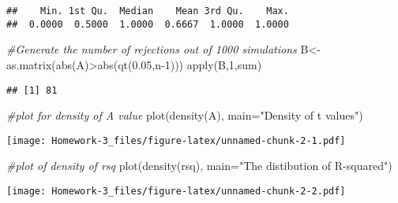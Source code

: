 \documentclass[
]{article}
\newenvironment{Shaded}{\begin{snugshade}}{\end{snugshade}}
\newcommand{\AttributeTok}[1]{\textcolor[rgb]{0.77,0.63,0.00}{#1}}
\newcommand{\CommentTok}[1]{\textcolor[rgb]{0.56,0.35,0.01}{\textit{#1}}}
\newcommand{\DecValTok}[1]{\textcolor[rgb]{0.00,0.00,0.81}{#1}}
\newcommand{\FloatTok}[1]{\textcolor[rgb]{0.00,0.00,0.81}{#1}}
\newcommand{\FunctionTok}[1]{\textcolor[rgb]{0.00,0.00,0.00}{#1}}
\newcommand{\NormalTok}[1]{#1}
\newcommand{\OtherTok}[1]{\textcolor[rgb]{0.56,0.35,0.01}{#1}}
\newcommand{\SpecialCharTok}[1]{\textcolor[rgb]{0.00,0.00,0.00}{#1}}
\newcommand{\StringTok}[1]{\textcolor[rgb]{0.31,0.60,0.02}{#1}}
\begin{document}
\begin{verbatim}
##    Min. 1st Qu.  Median    Mean 3rd Qu.    Max. 
##  0.0000  0.5000  1.0000  0.6667  1.0000  1.0000
\end{verbatim}

\begin{Shaded}
\begin{Highlighting}[]
\CommentTok{\#Generate the number of rejections out of 1000 simulations}
\NormalTok{B}\OtherTok{\textless{}{-}}\FunctionTok{as.matrix}\NormalTok{(}\FunctionTok{abs}\NormalTok{(A)}\SpecialCharTok{\textgreater{}}\FunctionTok{abs}\NormalTok{(}\FunctionTok{qt}\NormalTok{(}\FloatTok{0.05}\NormalTok{,n}\DecValTok{{-}1}\NormalTok{)))  }
\FunctionTok{apply}\NormalTok{(B,}\DecValTok{1}\NormalTok{,sum)}
\end{Highlighting}
\end{Shaded}

\begin{verbatim}
## [1] 81
\end{verbatim}

\begin{Shaded}
\begin{Highlighting}[]
\CommentTok{\#plot for density of A value}
\FunctionTok{plot}\NormalTok{(}\FunctionTok{density}\NormalTok{(A), }\AttributeTok{main=}\StringTok{"Density of t values"}\NormalTok{)}
\end{Highlighting}
\end{Shaded}

\texttt{[image: Homework-3\_files/figure-latex/unnamed-chunk-2-1.pdf]}

\begin{Shaded}
\begin{Highlighting}[]
\CommentTok{\#plot of density of rsq}
\FunctionTok{plot}\NormalTok{(}\FunctionTok{density}\NormalTok{(rsq), }\AttributeTok{main=}\StringTok{"The distibution of R{-}squared"}\NormalTok{)        }
\end{Highlighting}
\end{Shaded}

\texttt{[image: Homework-3\_files/figure-latex/unnamed-chunk-2-2.pdf]}
\end{document}
